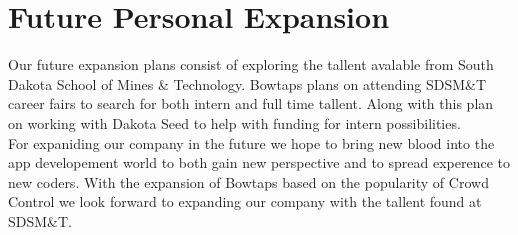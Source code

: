 \section{Future Personal Expansion}
Our future expansion plans consist of exploring the tallent avalable from South Dakota School of Mines \& Technology. Bowtaps plans on attending SDSM\&T career fairs to search for both intern and full time tallent. Along with this plan on working with Dakota Seed to help with funding for intern possibilities. \\
For expaniding our company in the future we hope to bring new blood into the app developement world to both gain new perspective and to spread experence to new coders. With the expansion of Bowtaps based on the popularity of Crowd Control we look forward to expanding our company with the tallent found at SDSM\&T.
